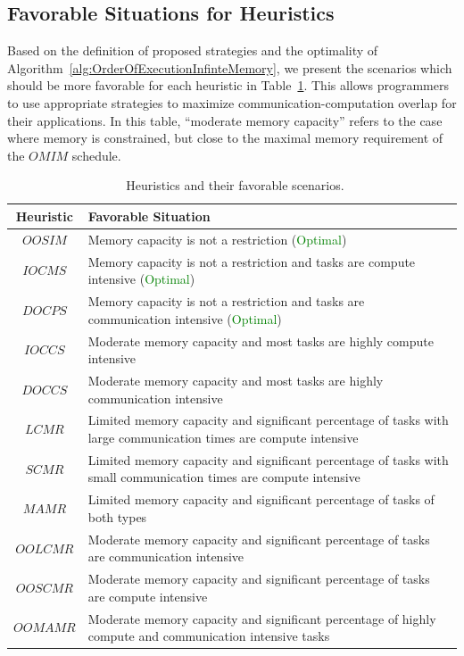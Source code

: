 \documentclass[runningheads]{llncs} %
\begin{document}
	\subsection{Favorable Situations for Heuristics}
		Based on the definition of proposed strategies and the optimality of Algorithm~\ref{alg:OrderOfExecutionInfinteMemory}, we present the scenarios which should be more favorable for each heuristic in Table~\ref{tab:heuristicsAndFavorableScenarios}. This allows programmers to use appropriate strategies to maximize communication-computation overlap for their applications. In this table, ``moderate memory capacity'' refers to the case where memory is constrained, but close to the maximal memory requirement of the $OMIM$ schedule.
		
	\begin{table}[htb]
		\begin{center}
		\begin{tabular}{|c|p{10.25cm}|}
			\hline
			\textbf{Heuristic} & \textbf{\hspace{2cm}Favorable Situation} \\ \hline
			$OOSIM$ & Memory capacity is not a restriction (\textcolor{green}{Optimal}) \\ \hline
			$IOCMS$ & Memory capacity is not a restriction and tasks are compute intensive (\textcolor{green}{Optimal}) \\ \hline
			$DOCPS$ & Memory capacity is not a restriction and tasks are communication intensive (\textcolor{green}{Optimal}) \\ \hline
			$IOCCS$ & Moderate memory capacity and most tasks are highly compute intensive \\ \hline
			$DOCCS$ & Moderate memory capacity and most tasks are highly communication intensive \\ \hline
			$LCMR$ & Limited memory capacity and significant percentage of tasks with large communication times are compute intensive\\ \hline
			$SCMR$ & Limited memory capacity and significant percentage of tasks with small communication times are compute intensive\\ \hline
			$MAMR$ & Limited memory capacity and significant percentage of tasks of both types\\ \hline
			$OOLCMR$ & Moderate memory capacity and significant percentage of tasks are communication intensive\\ \hline
			$OOSCMR$ & Moderate memory capacity and significant percentage of tasks are compute intensive \\ \hline
			$OOMAMR$ & Moderate memory capacity and significant percentage of highly compute and communication intensive tasks \\ \hline
		\end{tabular}\caption{~\label{tab:heuristicsAndFavorableScenarios}Heuristics and their favorable scenarios.}
		\end{center}
	\end{table}
\end{document}
